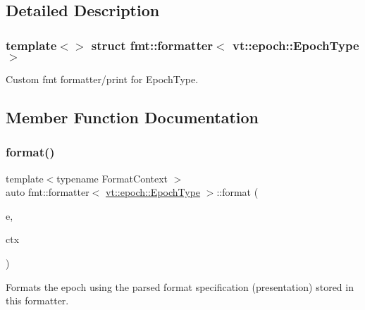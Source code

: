 \subsection{Detailed Description}
\subsubsection*{template$<$$>$\newline
struct fmt\+::formatter$<$ vt\+::epoch\+::\+Epoch\+Type $>$}

Custom fmt formatter/print for {\ttfamily Epoch\+Type}. 

\subsection{Member Function Documentation}
\mbox{\label{structfmt_1_1formatter_3_01vt_1_1epoch_1_1_epoch_type_01_4_ac72f5cb95971217a5b037a15d06941cd}} 
\subsubsection{\texorpdfstring{format()}{format()}}
{\footnotesize\ttfamily template$<$typename Format\+Context $>$ \\
auto fmt\+::formatter$<$ \hyperlink{structvt_1_1epoch_1_1_epoch_type}{vt\+::epoch\+::\+Epoch\+Type} $>$\+::format (\begin{DoxyParamCaption}\item[{\hyperlink{structvt_1_1epoch_1_1_epoch_type}{vt\+::epoch\+::\+Epoch\+Type} const \&}]{e,  }\item[{Format\+Context \&}]{ctx }\end{DoxyParamCaption})\hspace{0.3cm}{\ttfamily [inline]}}

Formats the epoch using the parsed format specification (presentation) stored in this formatter. \mbox{\label{structfmt_1_1formatter_3_01vt_1_1epoch_1_1_epoch_type_01_4_a6c360fe20d6ae9e16356a254228e66e7}} 
